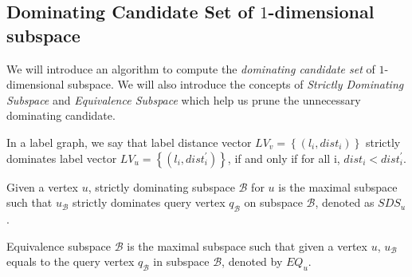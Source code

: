 \subsection{Dominating Candidate Set of $1$-dimensional subspace}

We will introduce an algorithm to compute the \emph{dominating candidate set} of $1$-dimensional subspace. We will also introduce the concepts of \emph{Strictly Dominating Subspace} and \emph{Equivalence Subspace} which help us prune the unnecessary dominating candidate.

\begin{definition}
In a label graph, we say that label distance vector $LV_v=\left\{(l_i, dist_i)\right\}$ strictly dominates label vector $LV_u=\left\{(l_i, dist_i^\prime)\right\}$, if and only if for all i, $dist_i < dist_i^\prime$.
\end{definition}

\begin{definition}
Given a vertex $u$, strictly dominating subspace $\mathcal{B}$ for $u$ is the maximal subspace such that $u_\mathcal{B}$ strictly dominates query vertex $q_\mathcal{B}$ on subspace $\mathcal{B}$, denoted as $\mathit{SDS}_u$.
\end{definition}

\begin{definition}
Equivalence subspace $\mathcal{B}$ is the maximal subspace such that given a vertex $u$, $u_\mathcal{B}$ equals to the query vertex $q_\mathcal{B}$ in subspace $\mathcal{B}$, denoted by $\mathit{EQ}_u$.
\end{definition}


